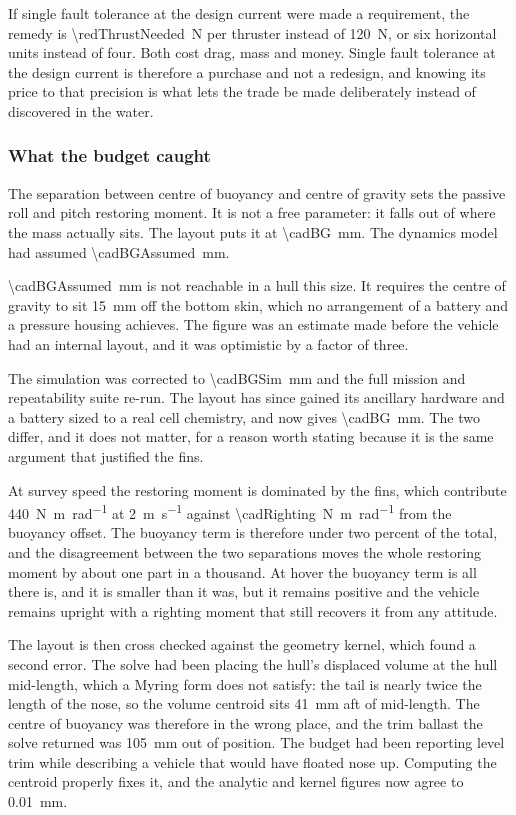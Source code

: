 \documentclass[10pt,a4paper]{article}
\begin{document}
If single fault tolerance at the design current were made a requirement, the
remedy is \SI{\redThrustNeeded}{\newton} per thruster instead of
\SI{120}{\newton}, or six horizontal units instead of four. Both cost drag,
mass and money. Single fault tolerance at the design current is therefore a
purchase and not a redesign, and knowing its price to that precision is what
lets the trade be made deliberately instead of discovered in the water.

\subsubsection{What the budget caught}\label{sec:cad-budget}

The separation between centre of buoyancy and centre of gravity sets the
passive roll and pitch restoring moment. It is not a free parameter: it falls
out of where the mass actually sits. The layout puts it at
\SI{\cadBG}{\milli\metre}. The dynamics model had assumed
\SI{\cadBGAssumed}{\milli\metre}.

\SI{\cadBGAssumed}{\milli\metre} is not reachable in a hull this size. It
requires the centre of gravity to sit \SI{15}{\milli\metre} off the bottom
skin, which no arrangement of a battery and a pressure housing achieves. The
figure was an estimate made before the vehicle had an internal layout, and it
was optimistic by a factor of three.

The simulation was corrected to \SI{\cadBGSim}{\milli\metre} and the full
mission and repeatability suite re-run. The layout has since gained its
ancillary hardware and a battery sized to a real cell chemistry, and now gives
\SI{\cadBG}{\milli\metre}. The two differ, and it does not matter, for a
reason worth stating because it is the same argument that justified the fins.

At survey speed the restoring moment is dominated by the fins, which
contribute \SI{440}{\newton\metre\per\radian} at \SI{2}{\metre\per\second}
against \SI{\cadRighting}{\newton\metre\per\radian} from the buoyancy offset.
The buoyancy term is therefore under two percent of the total, and the
disagreement between the two separations moves the whole restoring moment by
about one part in a thousand. At hover the buoyancy term is all there is, and
it is smaller than it was, but it remains positive and the vehicle remains
upright with a righting moment that still recovers it from any attitude.

The layout is then cross checked against the geometry kernel, which found a
second error. The solve had been placing the hull's displaced volume at the
hull mid-length, which a Myring form does not satisfy: the tail is nearly twice
the length of the nose, so the volume centroid sits \SI{41}{\milli\metre} aft
of mid-length. The centre of buoyancy was therefore in the wrong place, and the
trim ballast the solve returned was \SI{105}{\milli\metre} out of position. The
budget had been reporting level trim while describing a vehicle that would have
floated nose up. Computing the centroid properly fixes it, and the analytic and
kernel figures now agree to \SI{0.01}{\milli\metre}.
\end{document}
